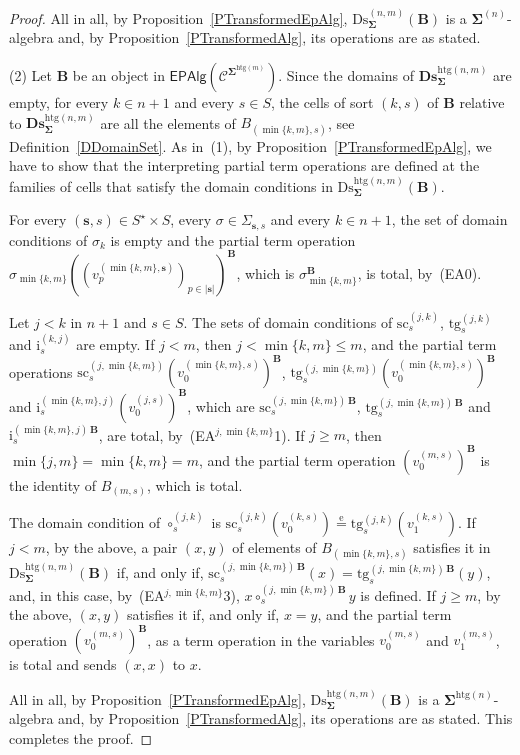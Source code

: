 \documentclass[a4paper, reqno]{amsbook}
\newcommand{\bb}[1]{\ensuremath{\lvert #1 \rvert}}
\newcommand{\sig}[1]{\mathbf{#1}}             %
\newcommand{\spec}[1]{\boldsymbol{\mathcal{#1}}} %
\newcommand{\eeq}{\overset{\mathrm e}{=}}      %
\newcommand{\htg}{\mathrm{htg}}                %
\newcommand{\src}{\mathrm{sc}}
\newcommand{\tgt}{\mathrm{tg}}
\newcommand{\Ds}{\mathrm{Ds}}
\newcommand{\bDs}{\mathbf{Ds}}
\theoremstyle{plain}
\theoremstyle{definition}
\begin{document}
\begin{proof}
All in all, by Proposition~\ref{PTransformedEpAlg}, $\Ds^{(n,m)}_{\sig{\Sigma}}(\mathbf{B})$ is a $\sig{\Sigma}^{(n)}$-algebra and, by Proposition~\ref{PTransformedAlg}, its operations are as stated.

(2) Let $\mathbf{B}$ be an object in $\mathsf{EPAlg}(\spec{C}^{\sig{\Sigma}^{\htg(m)}})$.
Since the domains of $\bDs^{\htg(n,m)}_{\sig{\Sigma}}$ are empty, for every $k\in n+1$ and every $s\in S$, the cells of sort $(k,s)$ of $\mathbf{B}$ relative to $\bDs^{\htg(n,m)}_{\sig{\Sigma}}$ are all the elements of $B_{(\min\{k,m\},s)}$, see Definition~\ref{DDomainSet}.
As in~(1), by Proposition~\ref{PTransformedEpAlg}, we have to show that the interpreting partial term operations are defined at the families of cells that satisfy the domain conditions in $\Ds^{\htg(n,m)}_{\sig{\Sigma}}(\mathbf{B})$.

For every $(\mathbf{s},s)\in S^{\star}\times S$, every $\sigma\in\Sigma_{\mathbf{s},s}$ and every $k\in n+1$, the set of domain conditions of $\sigma_{k}$ is empty and the partial term operation $\sigma_{\min\{k,m\}}((v^{(\min\{k,m\},\mathbf{s})}_{p})_{p\in\bb{\mathbf{s}}})^{\mathbf{B}}$, which is $\sigma^{\mathbf{B}}_{\min\{k,m\}}$, is total, by~(EA0).

Let $j<k$ in $n+1$ and $s\in S$.
The sets of domain conditions of $\src^{(j,k)}_{s}$, $\tgt^{(j,k)}_{s}$ and $\mathrm{i}^{(k,j)}_{s}$ are empty.
If $j<m$, then $j<\min\{k,m\}\leq m$, and the partial term operations $\src^{(j,\min\{k,m\})}_{s}(v^{(\min\{k,m\},s)}_{0})^{\mathbf{B}}$, $\tgt^{(j,\min\{k,m\})}_{s}(v^{(\min\{k,m\},s)}_{0})^{\mathbf{B}}$ and $\mathrm{i}^{(\min\{k,m\},j)}_{s}(v^{(j,s)}_{0})^{\mathbf{B}}$, which are $\src^{(j,\min\{k,m\})\,\mathbf{B}}_{s}$, $\tgt^{(j,\min\{k,m\})\,\mathbf{B}}_{s}$ and $\mathrm{i}^{(\min\{k,m\},j)\,\mathbf{B}}_{s}$, are total, by~(EA$^{j,\min\{k,m\}}$1).
If $j\geq m$, then $\min\{j,m\}=\min\{k,m\}=m$, and the partial term operation $(v^{(m,s)}_{0})^{\mathbf{B}}$ is the identity of $B_{(m,s)}$, which is total.

The domain condition of $\circ^{(j,k)}_{s}$ is $\src^{(j,k)}_{s}(v^{(k,s)}_{0})\eeq\tgt^{(j,k)}_{s}(v^{(k,s)}_{1})$.
If $j<m$, by the above, a pair $(x,y)$ of elements of $B_{(\min\{k,m\},s)}$ satisfies it in $\Ds^{\htg(n,m)}_{\sig{\Sigma}}(\mathbf{B})$ if, and only if, $\src^{(j,\min\{k,m\})\,\mathbf{B}}_{s}(x)=\tgt^{(j,\min\{k,m\})\,\mathbf{B}}_{s}(y)$, and, in this case, by~(EA$^{j,\min\{k,m\}}$3), $x\circ^{(j,\min\{k,m\})\,\mathbf{B}}_{s}y$ is defined.
If $j\geq m$, by the above, $(x,y)$ satisfies it if, and only if, $x=y$, and the partial term operation $(v^{(m,s)}_{0})^{\mathbf{B}}$, as a term operation in the variables $v^{(m,s)}_{0}$ and $v^{(m,s)}_{1}$, is total and sends $(x,x)$ to $x$.

All in all, by Proposition~\ref{PTransformedEpAlg}, $\Ds^{\htg(n,m)}_{\sig{\Sigma}}(\mathbf{B})$ is a $\sig{\Sigma}^{\htg(n)}$-algebra and, by Proposition~\ref{PTransformedAlg}, its operations are as stated. This completes the proof.
\end{proof}
\end{document}
